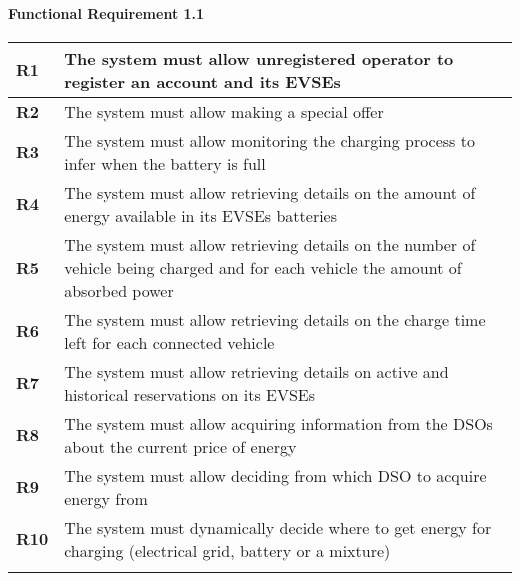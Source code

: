 \paragraph*{Functional Requirement 1.1}
\begin{table}[h]
    \begin{tabular}{|l|l|}
        \toprule
        \textbf{R1}  & The system must allow unregistered operator to register an account and its EVSEs                                                  \\ \midrule
        \textbf{R2}  & The system must allow making a special offer                                                                                      \\ \midrule
        \textbf{R3}  & The system must allow monitoring the charging process to infer when the battery is full                                           \\ \midrule
        \textbf{R4}  & The system must allow retrieving details on the amount of energy available in its EVSEs batteries                                 \\ \midrule
        \textbf{R5}  & The system must allow retrieving details on the number of vehicle being charged and for each vehicle the amount of absorbed power \\ \midrule
        \textbf{R6}  & The system must allow retrieving details on the charge time left for each connected vehicle                                       \\ \midrule
        \textbf{R7}  & The system must allow retrieving details on active and historical reservations on its EVSEs                                       \\ \midrule
        \textbf{R8}  & The system must allow acquiring information from the DSOs about the current price of energy                                       \\ \midrule
        \textbf{R9}  & The system must allow deciding from which DSO to acquire energy from                                                              \\ \midrule
        \textbf{R10} & The system must dynamically decide where to get energy for charging (electrical grid, battery or a mixture)                       \\ \midrule
                     &                                                                                                                                   \\ \bottomrule
    \end{tabular}
\end{table}
